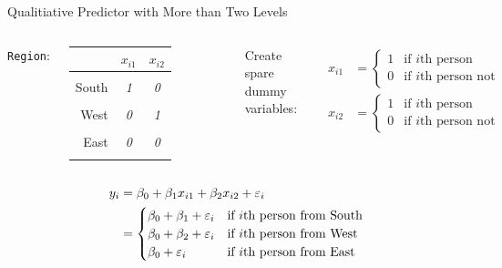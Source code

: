 \documentclass[aspectratio=169,usenames,dvipsnames]{beamer}
\newcommand{\InstructorNotes}[1]{\textit{\color{orange}#1}}
\begin{document}
	\begin{frame}[c]{Qualitiative Predictor with More than Two Levels}
	
	\begin{columns}
	\centering
	\texttt{Region}:
	
	\qquad
	
	\begin{tabular}{r|cc}
		 & $x_{i1}$ & $x_{i2}$ \\ \hline
		 & \\
		South & \InstructorNotes{1 } & \InstructorNotes{0} \\
		\\
		West & \InstructorNotes{0 } & \InstructorNotes{1}\\
		\\
		East& \InstructorNotes{0 } & \InstructorNotes{0}\\
		&
	\end{tabular}
	
	
	\centering
	Create spare dummy variables:
	
	\begin{align*}
			x_{i1} &=
		\begin{cases}
			1 & \text{if $i$th person from South}\\
			0 & \text{if $i$th person not from South}
		\end{cases}\\
			x_{i2} &=
		\begin{cases}
			1 & \text{if $i$th person from West}\\
			0 & \text{if $i$th person not from West}
		\end{cases}
	\end{align*}
	
	\end{columns}
	
	
	\begin{align*}
	y_i &= \beta_0 + \beta_1x_{i1}+ \beta_2x_{i2}+\varepsilon_i\\
	&=
		\begin{cases}
			\beta_0 + \beta_1+\varepsilon_i & \text{if $i$th person from South}\\
			\beta_0 +  \beta_2+\varepsilon_i& \text{if $i$th person from West}\\
			\beta_0 + \varepsilon_i & \text{if $i$th person from East}
		\end{cases}
	\end{align*}
	
	\end{frame}
\end{document}
